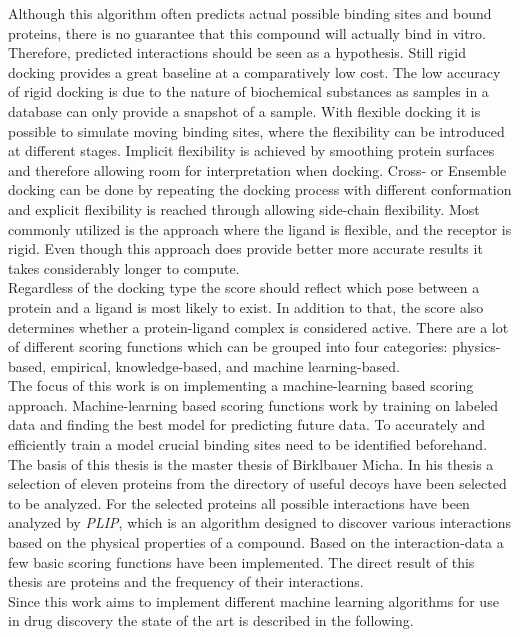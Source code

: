 Although this algorithm often predicts actual possible binding sites and bound proteins, there is no guarantee that this compound will actually bind in vitro. 
Therefore, predicted interactions should be seen as a hypothesis. Still rigid docking provides a great baseline at a comparatively low cost\cite{Gimeno2019}.
The low accuracy of rigid docking is due to the nature of biochemical substances as samples in a database can only provide a snapshot of a sample\cite{Pagadala2017}.
With flexible docking it is possible to simulate moving binding sites, where the flexibility can be introduced at different stages. 
Implicit flexibility is achieved by smoothing protein surfaces and therefore allowing room for interpretation when docking.
Cross- or Ensemble docking can be done by repeating the docking process with different conformation and 
explicit flexibility is reached through allowing side-chain flexibility.
Most commonly utilized is the approach where the ligand is flexible, and the receptor is rigid.
Even though this approach does provide better more accurate results 
it takes considerably longer to compute\cite{Pagadala2017}.
\\
Regardless of the docking type the score should reflect which pose between a protein and a ligand is most likely to exist.
In addition to that, the score also determines whether a protein-ligand complex is considered active. 
There are a lot of different scoring functions which can be grouped into four categories:  physics-based, empirical, knowledge-based, and machine learning-based\cite{Li2019}.
\\
The focus of this work is on implementing a machine-learning based scoring approach.
Machine-learning based scoring functions work by training on labeled data and finding the best model for predicting future data.
To accurately and efficiently train a model crucial binding sites need to be identified beforehand.
The basis of this thesis is the master thesis of Birklbauer Micha\cite{Birklbauer2021}.
In his thesis a selection of eleven proteins from the directory of useful decoys\cite{Mysinger2012} have been selected to be analyzed.
For the selected proteins all possible interactions have been analyzed by \textit{PLIP}, which is an algorithm designed to discover various interactions based on the physical properties of a compound\cite{Salentin2015}.
Based on the interaction-data a few basic scoring functions have been implemented.
The direct result of this thesis are proteins and the frequency of their interactions.
\\
Since this work aims to implement different machine learning algorithms for use in drug discovery the state of the art is described in the following. 


